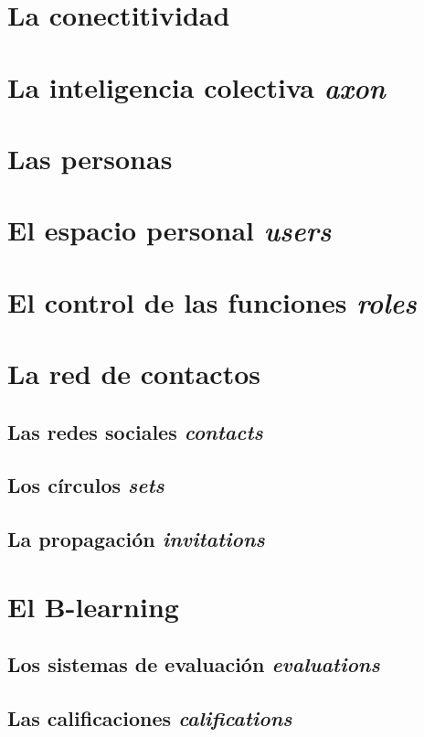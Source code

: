 \section{La conectitividad}

\section{La inteligencia colectiva \emph{axon}}

\section{Las personas}

\section{El espacio personal \emph{users}}
\section{El control de las funciones \emph{roles}}


\section{La red de contactos}

\subsection{Las redes sociales \emph{contacts}}
\subsection{Los círculos \emph{sets}}
\subsection{La propagación \emph{invitations}}


\section{El B-learning}

\subsection{Los sistemas de evaluación \emph{evaluations}}
\subsection{Las calificaciones \emph{califications}}

